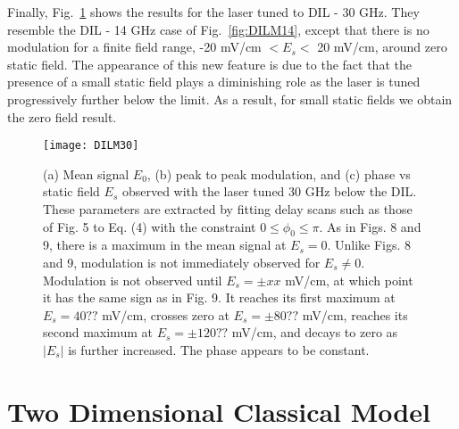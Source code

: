 \documentclass[aps,pra,preprint,groupedaddress]{revtex4-1}
\begin{document}
Finally, Fig.~\ref{fig:DILM30} shows the results for the laser tuned to DIL - 30 GHz. They resemble the DIL - 14 GHz case of Fig.~\ref{fig:DILM14}, except that there is no modulation for a finite field range, -20 mV/cm $<E_s<$ 20 mV/cm, around zero static field. The appearance of this new feature is due to the fact that the presence of a small static field plays a diminishing role as the laser is tuned progressively further below the limit. As a result, for small static fields we obtain the zero field result.


\begin{figure}
	\texttt{[image: DILM30]}
	\caption{(a) Mean signal $E_0$, (b) peak to peak modulation, and (c) phase vs static field $E_s$ observed with the laser tuned 30 GHz below the DIL. These parameters are extracted by fitting delay scans such as those of Fig. 5 to Eq. (4) with the constraint $0\leq\phi_0\leq\pi$. As in Figs. 8 and 9, there is a maximum in the mean signal at $E_s=0$. Unlike Figs. 8 and 9, modulation is not immediately observed for $E_s\neq 0$. Modulation is not observed until $E_s=\pm xx$ mV/cm, at which point it has the same sign as in Fig. 9. It reaches its first maximum at $E_s=40??$ mV/cm, crosses zero at $E_s=\pm 80 ?? $ mV/cm, reaches its second maximum at $E_s=\pm 120 ??$ mV/cm, and decays to zero as $|E_s|$ is further increased. The phase appears to be constant.}
	\label{fig:DILM30}
\end{figure}


\section{\label{sec:disc} Two Dimensional Classical Model}
\end{document}
